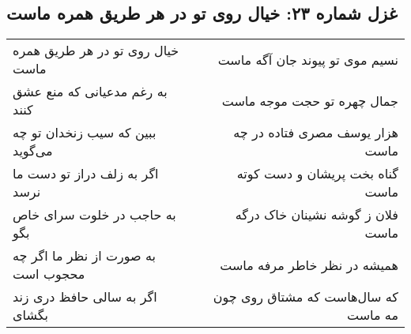 \begin{center}
\section*{غزل شماره ۲۳: خیال روی تو در هر طریق همره ماست}
\label{sec:sh023}
\begin{longtable}{l p{0.5cm} r}
خیال روی تو در هر طریق همره ماست
&&
نسیم موی تو پیوند جان آگه ماست
\\
به رغم مدعیانی که منع عشق کنند
&&
جمال چهره تو حجت موجه ماست
\\
ببین که سیب زنخدان تو چه می‌گوید
&&
هزار یوسف مصری فتاده در چه ماست
\\
اگر به زلف دراز تو دست ما نرسد
&&
گناه بخت پریشان و دست کوته ماست
\\
به حاجب در خلوت سرای خاص بگو
&&
فلان ز گوشه نشینان خاک درگه ماست
\\
به صورت از نظر ما اگر چه محجوب است
&&
همیشه در نظر خاطر مرفه ماست
\\
اگر به سالی حافظ دری زند بگشای
&&
که سال‌هاست که مشتاق روی چون مه ماست
\\
\end{longtable}
\end{center}
